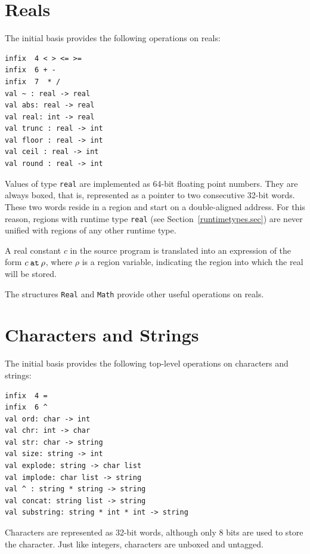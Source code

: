 \documentclass[12pt]{book}
\begin{document}
\section{Reals}
The 
%
initial basis provides the following operations on reals:
\index{{\tt =}}\index{{\tt <>}}\index{{\tt <}}\index{{\tt >}}\index{{\tt <=}}\index{{\tt >=}}\index{{\tt +}}\index{{\tt -}}\index{{\tt *}}\index{{\tt /}}\index{\verb+~+}
\begin{verbatim}
infix  4 < > <= >= 
infix  6 + - 
infix  7  * /
val ~ : real -> real
val abs: real -> real
val real: int -> real
val trunc : real -> int
val floor : real -> int
val ceil : real -> int
val round : real -> int
\end{verbatim}
Values of type {\tt real} are implemented as 64-bit floating point
numbers.  They are always boxed, that is, represented as a pointer to
two consecutive 32-bit words.  These two words reside
in a region and start on a double-aligned address. For this reason,
regions with 
%
runtime type {\tt real} (see
Section~\ref{runtimetypes.sec}) are never unified with regions of any
other runtime type.

A real constant $c$ in the source program is translated into an
expression of the form $c\mathbin{\hbox{\tt at}}\rho$, where $\rho$ is
a region variable, indicating the region into which the real will be
stored.

The structures {\tt Real} and {\tt Math} provide other useful
operations on reals.

\section{Characters and Strings}
The 
%
initial basis provides the following top-level operations on characters and strings:\index{{\tt =}}\index{\verb+^+}
\begin{verbatim}
infix  4 = 
infix  6 ^
val ord: char -> int
val chr: int -> char
val str: char -> string
val size: string -> int
val explode: string -> char list
val implode: char list -> string
val ^ : string * string -> string
val concat: string list -> string
val substring: string * int * int -> string
\end{verbatim}
Characters are represented as 32-bit words, although only 8 bits are
used to store the character. Just like integers, characters are
unboxed and untagged.
\end{document}

